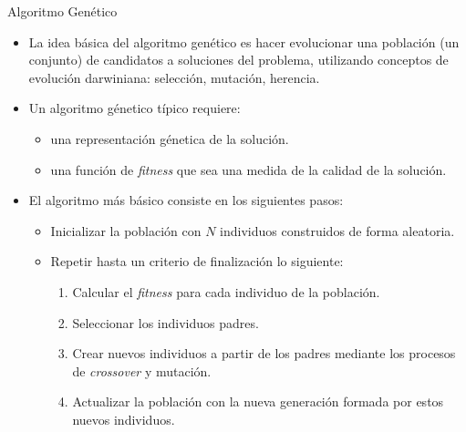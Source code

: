 \documentclass[center,10pt,cm]{beamer}
\begin{document}
\begin{frame}{Algoritmo Gen\'etico}

  \begin{itemize}\itemsep0.2cm
  \item La idea b\'asica del algoritmo gen\'etico es hacer evolucionar una poblaci\'on (un conjunto) de candidatos a soluciones del problema, utilizando conceptos
    de evoluci\'on darwiniana: selecci\'on, mutaci\'on, herencia.

  \item  Un algoritmo g\'enetico t\'ipico requiere:

    \begin{itemize}\itemsep0.2cm
    \item una representaci\'on g\'enetica de la soluci\'on.
    \item una funci\'on de \emph{fitness} que sea una medida de la calidad de la soluci\'on.
    \end{itemize}

  \item El algoritmo m\'as b\'asico consiste en los siguientes pasos:

    \begin{itemize}\itemsep0.2cm
    \item Inicializar la poblaci\'on con $N$ individuos construidos de forma aleatoria.
    \item Repetir hasta un criterio de finalizaci\'on lo siguiente:
      \begin{enumerate}\itemsep0.1cm
      \item Calcular el \emph{fitness} para cada individuo de la poblaci\'on.
      \item Seleccionar los individuos padres.
      \item Crear nuevos individuos a partir de los padres mediante los procesos de \emph{crossover} y mutaci\'on.
      \item Actualizar la poblaci\'on con la nueva generaci\'on formada por estos nuevos individuos.
      \end{enumerate}
    \end{itemize}
  \end{itemize}
\end{frame}
\end{document}
